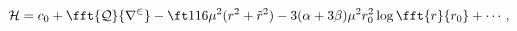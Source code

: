 \begin{equation}
{\cal H}=c_0+\fft{\cal Q}{r^2}-\ft1{16}\mu^2(r^2+\tilde
r^2)-3(\alpha+3\beta)\mu^2r_0^2\log\fft{r}{r_0}+\cdots,
\end{equation}

